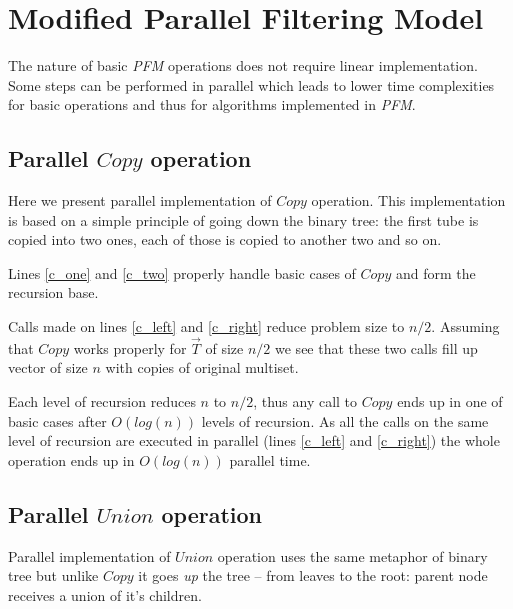 \section{Modified Parallel Filtering Model}\label{mpfm}

The nature of basic \emph{PFM} operations does not require linear implementation. Some steps can be performed in parallel which leads to lower time complexities for basic operations and thus for algorithms implemented in \emph{PFM}.

\subsection{Parallel $Copy$ operation}

Here we present parallel implementation of $Copy$ operation. This implementation is based on a simple principle of going down the binary tree: the first tube is copied into two ones, each of those is copied to another two and so on.


Lines \ref{c_one} and \ref{c_two} properly handle basic cases of $Copy$ and form the recursion base.

Calls made on lines \ref{c_left} and \ref{c_right} reduce problem size to $n/2$. Assuming that $Copy$ works properly for $\vec{T}$ of size $n/2$ we see that these two calls fill up vector of size $n$ with copies of original multiset.

Each level of recursion reduces $n$ to $n/2$, thus any call to $Copy$ ends up in one of basic cases after $O(log(n))$ levels of recursion. As all the calls on the same level of recursion are executed in parallel (lines \ref{c_left} and \ref{c_right}) the whole operation ends up in $O(log(n))$ parallel time.

\subsection{Parallel $Union$ operation}

Parallel implementation of $Union$ operation uses the same metaphor of binary tree but unlike $Copy$ it goes \emph{up} the tree -- from leaves to the root: parent node receives a union of it's children.

